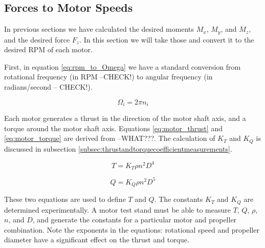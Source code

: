 \documentclass{article}
\numberwithin{equation}{section} %
\begin{document}
\subsection{Forces to Motor Speeds} \label{subsec:forcestomotorspeeds}
In previous sections we have calculated the desired moments $M_x$, $M_y$, and $M_z$, and the desired force $F_z$. In this section we will take those and convert it to the desired RPM of each motor.

First, in equation \eqref{eq:rpm_to_Omega} we have a standard conversion from rotational frequency (in RPM --CHECK!) to angular frequency (in radians/second -- CHECK!).
 
\begin{equation} \label{eq:rpm_to_Omega}
\Omega_i = 2 \pi n_i
\end{equation}

Each motor generates a thrust in the direction of the motor shaft axis, and a torque around the motor shaft axis. Equations \eqref{eq:motor_thrust} and \eqref{eq:motor_torque} are derived from --WHAT???. The calculation of $K_T$ and $K_Q$ is discussed in subsection \ref{subsec:thrustandtorquecoefficientmeasurements}.


\begin{equation} \label{eq:motor_thrust}
T = K_T\rho n^2 D^4
\end{equation}

\begin{equation} \label{eq:motor_torque}
Q = K_Q\rho n^2 D^5
\end{equation}

%

These two equations are used to define $T$ and $Q$. The constants $K_T$ and $K_Q$ are determined experimentally. A motor test stand must be able to measure $T$, $Q$, $\rho$, $n$, and $D$, and generate the constants for a particular motor and propeller combination. Note the exponents in the equations: rotational speed and propeller diameter have a significant effect on the thrust and torque.
\end{document}
